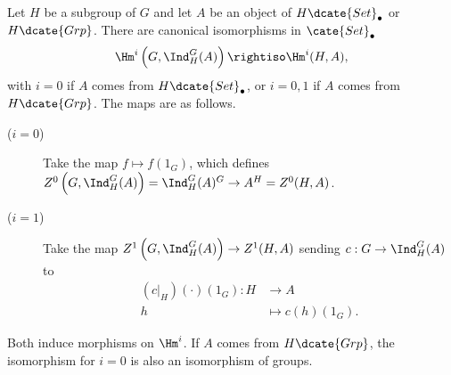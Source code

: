 \begin{theorem}\label{prop:Shapiro-noncommutative}
	Let $H$ be a subgroup of $G$ and let $A$ be an object of
	$H\dcate{Set}_\bullet$ or $H\dcate{Grp}$. There are canonical
	isomorphisms in $\cate{Set}_\bullet$
	\[ \Hm^i\left(G, \Ind^G_H(A)\right) \rightiso \Hm^i(H, A), \]
	with $i=0$ if $A$ comes from $H\dcate{Set}_\bullet$, or $i=0,1$ if $A$
	comes from $H\dcate{Grp}$. The maps are as follows.
	\begin{description}
		\item[($i=0$)] Take the map $f\mapsto f(1_G)$, which defines
		$Z^0\left(G,\Ind^G_H(A)\right)=\Ind^G_H(A)^G\to A^H=Z^0(H,A)$.
		\item[($i=1$)] Take the map
		$Z^1\left(G,\Ind^G_H(A)\right)\to Z^1(H,A)$ sending
		$c:G\to\Ind^G_H(A)$ to
		\begin{align*}
			(c|_H)(\cdot)(1_G): H & \to A \\
			h & \mapsto c(h)(1_G).
		\end{align*}
	\end{description}
	Both induce morphisms on $\Hm^i$. If $A$ comes from $H\dcate{Grp}$, the
	isomorphism for $i=0$ is also an isomorphism of groups.
\end{theorem}
